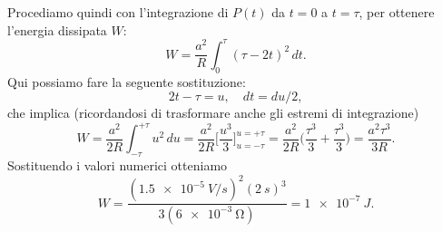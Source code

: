\documentclass[10pt]{gulartcl}
\begin{document}
\begin{solution}
Procediamo quindi con l’integrazione di $P(t)$ da $t = 0$ a $t = \tau$, per
ottenere l’energia dissipata $W$:
\begin{equation}
    W = \frac{a^2}{R} \int_{0}^{\tau} (\tau - 2t)^2 \, dt.
\end{equation}
Qui possiamo fare la seguente sostituzione:
\begin{equation}
    2t - \tau = u, \quad dt = du / 2,
\end{equation}
che implica (ricordandosi di trasformare anche gli estremi di integrazione)
\begin{equation}
    W = \frac{a^2}{2R} \int_{-\tau}^{+\tau} u^2 \, du
      = \frac{a^2}{2R} \biggl[\frac{u^3}{3}\biggr]_{u = -\tau}^{u = +\tau}
      = \frac{a^2}{2R}\biggl(\frac{\tau^3}{3} + \frac{\tau^3}{3}\biggr)
      = \frac{a^2 \tau^3}{3 R}.
\end{equation}
Sostituendo i valori numerici otteniamo
\begin{equation}
    W = \frac{(\qty{1.5e-5}{V \per s})^2 (\qty{2}{s})^3}%
             {3 (\qty{6e-3}{\ohm})}
      = \qty{1e-7}{J}.
\end{equation}
\end{solution}
\end{document}
